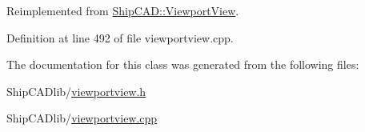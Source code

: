 Reimplemented from \hyperlink{classShipCAD_1_1ViewportView_a2dc46f8d032d707308cf853c70bc965a}{Ship\-C\-A\-D\-::\-Viewport\-View}.



Definition at line 492 of file viewportview.\-cpp.



The documentation for this class was generated from the following files\-:\begin{DoxyCompactItemize}
\item 
Ship\-C\-A\-Dlib/\hyperlink{viewportview_8h}{viewportview.\-h}\item 
Ship\-C\-A\-Dlib/\hyperlink{viewportview_8cpp}{viewportview.\-cpp}\end{DoxyCompactItemize}
